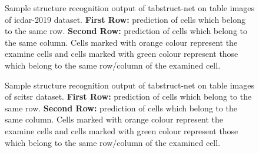 \documentclass[runningheads]{llncs}
\begin{document}
\begin{figure}
\begin{center}
\hspace{-0.01\textwidth}
\hspace{-0.01\textwidth}
\vspace{0.001\textwidth}
\hspace{-0.01\textwidth}
\hspace{-0.01\textwidth}
\end{center}
\caption{Sample structure recognition output of {\sc t}ab{\sc s}truct-{\sc n}et on table images of {\sc icdar}-2019 dataset. \textbf{First Row:} prediction of cells which belong to the same row. \textbf{Second Row:} prediction of cells which belong to the same column. Cells marked with orange colour represent the examine cells and cells marked with green colour represent those which belong to the same row/column of the examined cell.}
\label{fig_icdar_2019_structure}
\end{figure}
\begin{figure}
\begin{center}
\hspace{-0.01\textwidth}
\hspace{-0.01\textwidth}
\vspace{0.001\textwidth}
\hspace{-0.01\textwidth}
\hspace{-0.01\textwidth}
\end{center}
\caption{Sample structure recognition output of {\sc t}ab{\sc s}truct-{\sc n}et on table images of {\sc s}ci{\sc tsr} dataset. \textbf{First Row:} prediction of cells which belong to the same row. \textbf{Second Row:} prediction of cells which belong to the same column. Cells marked with orange colour represent the examine cells and cells marked with green colour represent those which belong to the same row/column of the examined cell.}
\label{fig_scitsr_structure}
\end{figure}
\end{document}
